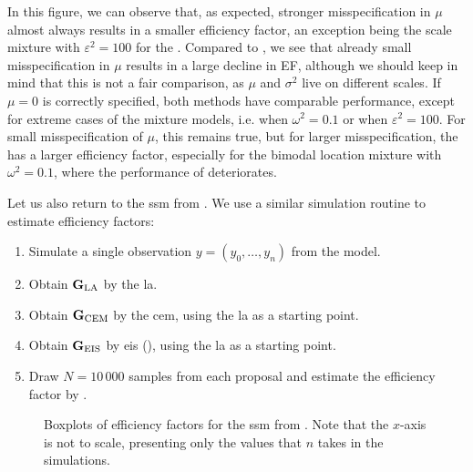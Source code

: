 In this figure, we can observe that, as expected, stronger misspecification in $\mu$ almost always results in a smaller efficiency factor, an exception being the scale mixture with $\varepsilon^{2} = 100$ for the \acem. 
Compared to , we see that already small misspecification in $\mu$ results in a large decline in EF, although we should keep in mind that this is not a fair comparison, as $\mu$ and $\sigma^{2}$ live on different scales.
If $\mu = 0 $ is correctly specified, both methods have comparable performance, except for extreme cases of the mixture models, i.e. when $\omega^{2} = 0.1$ or when $\varepsilon^{2} = 100$. 
For small misspecification of $\mu$, this remains true, but for larger misspecification, the \acem has a larger efficiency factor, especially for the bimodal location mixture with $\omega^{2} = 0.1$, where the performance of \aeis deteriorates. 

Let us also return to the \acrshort{ssm} from . We use a similar simulation routine to estimate efficiency factors:

\begin{enumerate}
    \item Simulate a single observation $y=(y_{0}, \dots, y_{n})$ from the model.
    \item Obtain $\mathbf G_{\text{LA}}$ by the \acrshort{la}.
    \item Obtain $\mathbf G_{\text{CEM}}$ by the \acrshort{cem}, using the \acrshort{la} as a starting point.
    \item Obtain $\mathbf G_{\text{EIS}}$ by \acrshort{eis} (), using the \acrshort{la} as a starting point. 
    \item Draw $N = 10\,000$ samples from each proposal and estimate the efficiency factor by  .
\end{enumerate}

\begin{figure}
    \centering

    \resizebox{\textwidth}{!}{%
    }
    \caption{Boxplots of efficiency factors for the \acrshort{ssm} from . Note that the $x$-axis is not to scale, presenting only the values that $n$ takes in the simulations.} 
    \label{fig:ssm_comparison_efficiency_factor}
\end{figure} 

